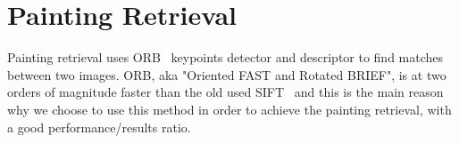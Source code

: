 \section{Painting Retrieval}
Painting retrieval uses ORB~\cite{orb} keypoints detector and descriptor to find matches between two images. ORB, aka "Oriented FAST and Rotated BRIEF", is at two orders of magnitude faster than the old used SIFT~\cite{sift} and this is the main reason why we choose to use this method in order to achieve the painting retrieval, with a good performance/results ratio.